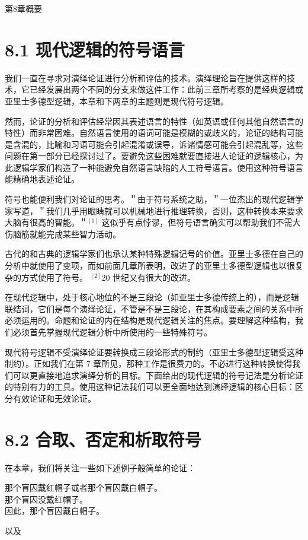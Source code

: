 第8章概要

\section*{8.1 现代逻辑的符号语言}
我们一直在寻求对演绎论证进行分析和评估的技术。演绎理论旨在提供这样的技术，它已经发展出两个不同的分支来做这件工作：此前三章所考察的是经典逻辑或亚里士多德型逻辑，本章和下两章的主题则是现代符号逻辑。

然而，论证的分析和评估经常因其表述语言的特性（如英语或任何其他自然语言的特性）而非常困难。自然语言使用的语词可能是模糊的或歧义的，论证的结构可能是含混的，比喻和习语可能会引起混淆或误导，诉诸情感可能会引起混乱等，这些问题在第一部分已经探讨过了。要避免这些困难就要直接进人论证的逻辑核心，为此逻辑学家们构造了一种能避免自然语言缺陷的人工符号语言。使用这种符号语言能精确地表述论证。

符号也能便利我们对论证的思考。＂由于符号系统之助，＂一位杰出的现代逻辑学家写道，＂我们几乎用眼睛就可以机械地进行推理转换，否则，这种转换本来要求大脑有很高的智能。＂${ }^{[1]}$ 这似乎有点悖谬，但符号语言确实可以帮助我们不需大伤脑筋就能完成某些智力活动。

古代的和古典的逻辑学家们也承认某种特殊逻辑记号的价值。亚里士多德在自己的分析中就使用了变项，而如前面几章所表明，改进了的亚里士多德型逻辑也以很复杂的方式使用了符号。 ${ }^{[2]} 20$ 世纪又有很大的改进。

在现代逻辑中，处于核心地位的不是三段论（如亚里士多德传统上的），而是逻辑联结词，它们是每个演绎论证，不管是不是三段论，在其构成要素之间的关系中所必须运用的。命题和论证的内在结构是现代逻辑关注的焦点。要理解这种结构，我们必须首先掌握现代逻辑分析中所使用的一些特殊符号。

现代符号逻辑不受演绎论证要转换成三段论形式的制约（亚里士多德型逻辑受这种制约）。正如我们在第 7 章所见，那种工作是很费力的。不必进行这种转换使得我们可以更直接地追求演绎分析的目标。下面给出的现代逻辑的符号记法是分析论证的特别有力的工具。使用这种记法我们可以更全面地达到演绎逻辑的核心目标：区分有效论证和无效论证。

\section*{8.2 合取、否定和析取符号}
在本章，我们将关注一些如下述例子般简单的论证：

那个盲囚戴红帽子或者那个盲囚戴白帽子。\\
那个盲囚没戴红帽子。\\
因此，那个盲囚戴白帽子。

以及


